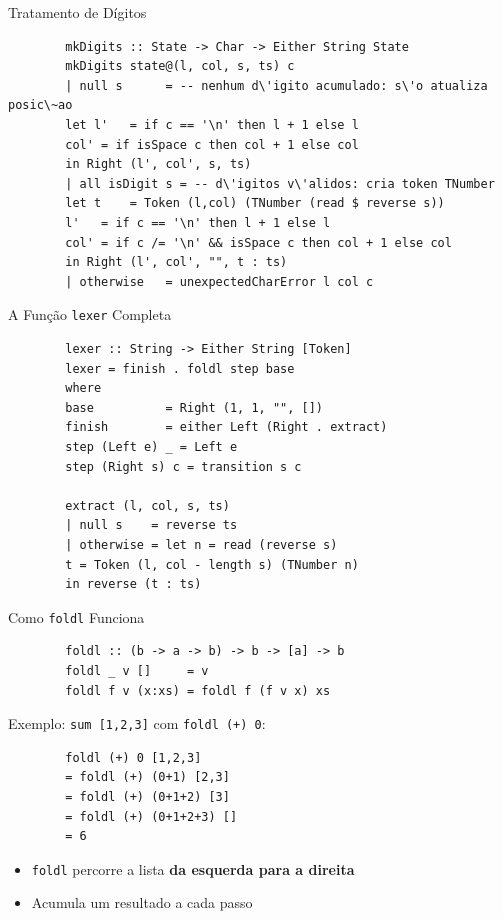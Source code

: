 \begin{frame}[fragile]{Tratamento de Dígitos}

    \begin{lstlisting}
        mkDigits :: State -> Char -> Either String State
        mkDigits state@(l, col, s, ts) c
        | null s      = -- nenhum d\'igito acumulado: s\'o atualiza posic\~ao
        let l'   = if c == '\n' then l + 1 else l
        col' = if isSpace c then col + 1 else col
        in Right (l', col', s, ts)
        | all isDigit s = -- d\'igitos v\'alidos: cria token TNumber
        let t    = Token (l,col) (TNumber (read $ reverse s))
        l'   = if c == '\n' then l + 1 else l
        col' = if c /= '\n' && isSpace c then col + 1 else col
        in Right (l', col', "", t : ts)
        | otherwise   = unexpectedCharError l col c
    \end{lstlisting}
\end{frame}

\begin{frame}[fragile]{A Função \texttt{lexer}
    Completa}

    \begin{lstlisting}
        lexer :: String -> Either String [Token]
        lexer = finish . foldl step base
        where
        base          = Right (1, 1, "", [])
        finish        = either Left (Right . extract)
        step (Left e) _ = Left e
        step (Right s) c = transition s c

        extract (l, col, s, ts)
        | null s    = reverse ts
        | otherwise = let n = read (reverse s)
        t = Token (l, col - length s) (TNumber n)
        in reverse (t : ts)
    \end{lstlisting}
\end{frame}

\begin{frame}[fragile]{Como \texttt{foldl} Funciona}

    \begin{lstlisting}
        foldl :: (b -> a -> b) -> b -> [a] -> b
        foldl _ v []     = v
        foldl f v (x:xs) = foldl f (f v x) xs
    \end{lstlisting}

    Exemplo: \texttt{sum [1,2,3]} com
    \texttt{foldl (+) 0}:

    \begin{lstlisting}
        foldl (+) 0 [1,2,3]
        = foldl (+) (0+1) [2,3]
        = foldl (+) (0+1+2) [3]
        = foldl (+) (0+1+2+3) []
        = 6
    \end{lstlisting}

    \begin{itemize}

        \item
        \texttt{foldl} percorre a lista \textbf{da esquerda
        para a direita}
        \item
        Acumula um resultado a cada passo
    \end{itemize}
\end{frame}

